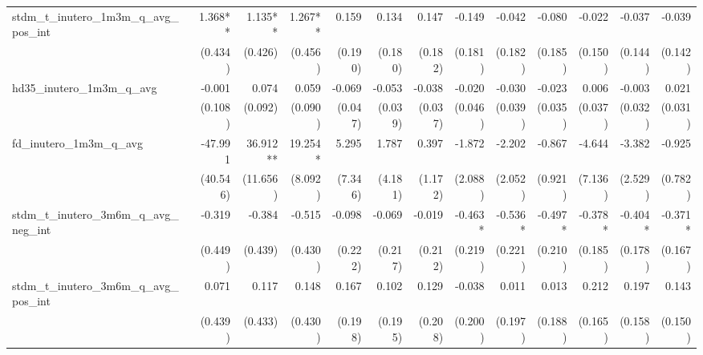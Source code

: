 \begin{tabular}{lrrrrrrrrrrrr}
stdm\_t\_inutero\_1m3m\_q\_avg\_pos\_int    &      1.368** &      1.135** &      1.267** &        0.159 &        0.134 &        0.147 &       -0.149 &       -0.042 &       -0.080 &       -0.022 &       -0.037 &       -0.039 \\ 
                                            &      (0.434) &      (0.426) &      (0.456) &      (0.190) &      (0.180) &      (0.182) &      (0.181) &      (0.182) &      (0.185) &      (0.150) &      (0.144) &      (0.142) \\ 
hd35\_inutero\_1m3m\_q\_avg                 &       -0.001 &        0.074 &        0.059 &       -0.069 &       -0.053 &       -0.038 &       -0.020 &       -0.030 &       -0.023 &        0.006 &       -0.003 &        0.021 \\ 
                                            &      (0.108) &      (0.092) &      (0.090) &      (0.047) &      (0.039) &      (0.037) &      (0.046) &      (0.039) &      (0.035) &      (0.037) &      (0.032) &      (0.031) \\ 
fd\_inutero\_1m3m\_q\_avg                   &      -47.991 &     36.912** &      19.254* &        5.295 &        1.787 &        0.397 &       -1.872 &       -2.202 &       -0.867 &       -4.644 &       -3.382 &       -0.925 \\ 
                                            &     (40.546) &     (11.656) &      (8.092) &      (7.346) &      (4.181) &      (1.172) &      (2.088) &      (2.052) &      (0.921) &      (7.136) &      (2.529) &      (0.782) \\ 
stdm\_t\_inutero\_3m6m\_q\_avg\_neg\_int    &       -0.319 &       -0.384 &       -0.515 &       -0.098 &       -0.069 &       -0.019 &      -0.463* &      -0.536* &      -0.497* &      -0.378* &      -0.404* &      -0.371* \\ 
                                            &      (0.449) &      (0.439) &      (0.430) &      (0.222) &      (0.217) &      (0.212) &      (0.219) &      (0.221) &      (0.210) &      (0.185) &      (0.178) &      (0.167) \\ 
stdm\_t\_inutero\_3m6m\_q\_avg\_pos\_int    &        0.071 &        0.117 &        0.148 &        0.167 &        0.102 &        0.129 &       -0.038 &        0.011 &        0.013 &        0.212 &        0.197 &        0.143 \\ 
                                            &      (0.439) &      (0.433) &      (0.430) &      (0.198) &      (0.195) &      (0.208) &      (0.200) &      (0.197) &      (0.188) &      (0.165) &      (0.158) &      (0.150) \\ 

\end{tabular}
